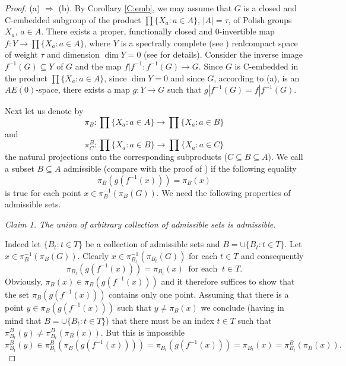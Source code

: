\documentclass[12pt,draft]{amsart}
\theoremstyle{plain}
\theoremstyle{definition}
\numberwithin{equation}{section}
\begin{document}
\begin{proof}
(a) $\Longrightarrow$ (b). By Corollary \ref{C:emb}, we may
assume that $G$ is a closed and $\text{C}$-embedded subgroup
of the product $\displaystyle \prod\{ X_{a} \colon a \in A\}$,
$|A| = \tau$, of Polish groups $X_{a}$, $a \in A$. There exists
a proper, functionally closed and $0$-invertible map
$f \colon Y \to \prod\{ X_{a} \colon a \in A \}$, where $Y$
is a spectrally complete (see \cite[p.247]{chibook96})
realcompact space of weight $\tau$ and dimension $\dim Y = 0$
(see \cite[Proposition 6.2.13]{chibook96} for details).
Consider the inverse image $f^{-1}(G) \subseteq Y$ of $G$ and
the map $f|f^{-1} \colon f^{-1}(G) \to G$. Since $G$ is
$\text{C}$-embedded in the product $\displaystyle \prod\{
X_{a} \colon a \in A\}$, since $\dim Y = 0$ and since $G$,
according to (a), is an $AE(0)$-space, there exists a map
$g \colon Y \to G$ such that $g|f^{-1}(G) = f|f^{-1}(G)$.

Next let us denote by 
\[ \pi_{B} \colon \prod\{ X_{a} \colon a \in A\} \to
\prod\{ X_{a} \colon a \in B\}\] 
and
\[\pi^{B}_{C} \colon \prod\{ X_{a} \colon a \in B\} \to
\prod\{ X_{a} \colon a \in C \}\]
the natural projections onto the corresponding subproducts
($C \subseteq B \subseteq A$).
We call a subset $B \subseteq A$ admissible (compare
with the proof of \cite[Theorem 6.3.1]{chibook96}) if the
following equality
\[ \pi_{B}(g(f^{-1}(x))) = \pi_{B}(x)\]
is true for each point $x \in \pi_{B}^{-1}\left(\pi_{B}(G)
\right)$. We need the following properties of admissible sets.

{\em Claim 1. The union of arbitrary collection of admissible
sets is admissible}. 

Indeed let $\{ B_{t} \colon t \in T\}$ be a collection of
admissible sets and $B = \cup \{ B_{t} \colon t \in T\}$.
Let $x \in \pi_{B}^{-1}\left(\pi_{B}(G)\right)$. Clearly
$x \in \pi_{B_{t}}^{-1}\left(\pi_{B_{t}}(G)\right)$ for each
$t \in T$ and consequently 
\[ \pi_{B_{t}}(g(f^{-1}(x))) = \pi_{B_{t}}(x) \;\;\text{for
each}\;\; t \in T .\]
Obviously, $\pi_{B}(x) \in \pi_{B}(g(f^{-1}(x)))$ and it
therefore suffices to show that the set $\pi_{B}(g(f^{-1}(x)))$
contains only one point. Assuming that there is a point
$y \in \pi_{B}(g(f^{-1}(x)))$ such that $y \neq \pi_{B}(x)$
we conclude (having in mind that $B = \cup\{ B_{t} \colon
t \in T\}$) that there must be an index $t \in T$ such that
$\pi_{B_{t}}^{B}(y) \neq \pi_{B_{t}}^{B}\left(\pi_{B}(x)\right)$.
But this is impossible
\[ \pi_{B_{t}}^{B}(y) \in \pi_{B_{t}}^{B}\left(\pi_{B}
(g(f^{-1}(x)))\right) = \pi_{B_{t}}(g(f^{-1}(x))) = \pi_{B_{t}}(x) = \pi_{B_{t}}^{B}\left(\pi_{B}(x)\right) .\]


\end{proof}
\end{document}
